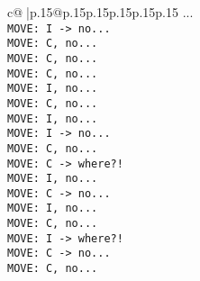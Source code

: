 \documentclass{article}
\begin{document}
{\begin{supertabular}{c@{$\;$}|p{.15\linewidth}@{}p{.15\linewidth}p{.15\linewidth}p{.15\linewidth}p{.15\linewidth}p{.15\linewidth}}
{{{...\\ \tt  MOVE: I -> no...\\ \tt  MOVE: C, no...\\ \tt  MOVE: C, no...\\ \tt  MOVE: C, no...\\ \tt  MOVE: I, no...\\ \tt  MOVE: C, no...\\ \tt  MOVE: I, no...\\ \tt  MOVE: I -> no...\\ \tt  MOVE: C, no...\\ \tt  MOVE: C -> where?!\\ \tt  MOVE: I, no...\\ \tt  MOVE: C -> no...\\ \tt  MOVE: I, no...\\ \tt  MOVE: C, no...\\ \tt  MOVE: I -> where?!\\ \tt  MOVE: C -> no...\\ \tt  MOVE: C, no...\\ \tt  }}}
\end{supertabular}}
\end{document}
